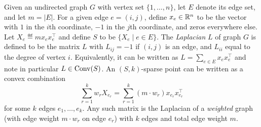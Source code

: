 \documentclass[paper.tex]{subfiles}
\begin{document}
\begin{example}
\label{ex:graph}
Given an undirected graph $G$ with vertex set $\{1,\ldots,n\}$, let $E$ 
denote its edge set, and let $m = |E|$. For a given 
edge $e = (i,j)$, define $x_e \in \mathbb R^n$ to be the vector with 
$1$ in the $i$th coordinate, $-1$ in the $j$th coordinate, and 
zeros everywhere else. Let $X_e \eqdef mx_{e} x_{e}^{\top}$ and 
define $S$ to be $\{X_e \mid e \in E\}$.
The \emph{Laplacian} $L$ of graph $G$ is defined to be the matrix $L$ 
with $L_{ij} = -1$ if $(i,j)$ is an edge, and $L_{ii}$ equal to 
the degree of vertex $i$. Equivalently, it can be written as 
$L = \sum_{e \in E} x_{e} x_{e}^{\top}$ and note in particular $L \in \operatorname{Conv}(S)$.
An $(S,k)$-sparse point can be written as a convex combination 
\[ \sum_{r=1}^k w_rX_{e_r} = \sum_{r=1}^k (m\cdot w_r)x_{e_r}x_{e_r}^{\top} \]
for some $k$ edges $e_1,\ldots,e_k$. Any such matrix is the Laplacian 
of a \emph{weighted} graph (with edge weight $m\cdot w_r$ on edge $e_r$) 
with $k$ edges and total edge weight $m$.
\end{example}
\end{document}
